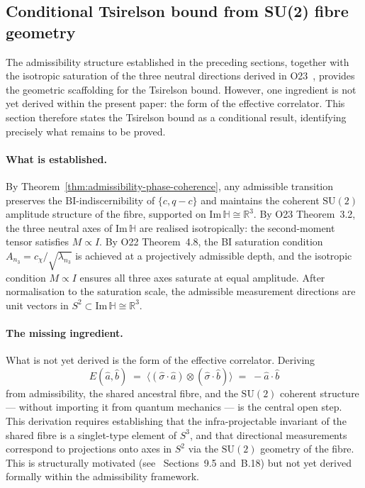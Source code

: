 \subsection{Conditional Tsirelson bound from SU(2) fibre geometry}
  \label{subsec:tsirelson}

  The admissibility structure established in the preceding sections, together with
  the isotropic saturation of the three neutral directions derived in O23~\cite{O23},
  provides the geometric scaffolding for the Tsirelson bound.
  However, one ingredient is not yet derived within the present paper: the
  form of the effective correlator.
  This section therefore states the Tsirelson bound as a conditional result,
  identifying precisely what remains to be proved.

  \paragraph{What is established.}

    By Theorem~\ref{thm:admissibility-phase-coherence}, any admissible transition
    preserves the $\mathrm{BI}$-indiscernibility of $\{c, q-c\}$ and maintains
    the coherent $\mathrm{SU}(2)$ amplitude structure of the fibre, supported on
    $\mathrm{Im}\,\mathbb{H} \cong \mathbb{R}^3$.
    By O23 Theorem~3.2, the three neutral axes of $\mathrm{Im}\,\mathbb{H}$
    are realised isotropically: the second-moment tensor satisfies $M \propto I$.
    By O22 Theorem~4.8, the BI saturation condition $A_{n_3} = c_\chi/\sqrt{\lambda_{n_3}}$
    is achieved at a projectively admissible depth, and the isotropic condition
    $M \propto I$ ensures all three axes saturate at equal amplitude.
    After normalisation to the saturation scale, the admissible measurement directions
    are unit vectors in $S^2 \subset \mathrm{Im}\,\mathbb{H} \cong \mathbb{R}^3$.

  \paragraph{The missing ingredient.}

    What is not yet derived is the form of the effective correlator.
    Deriving
    \begin{equation}
      \label{eq:singlet-correlator}
      E(\hat{a}, \hat{b})
      \;=\;
      \langle (\hat{\sigma} \cdot \hat{a}) \otimes (\hat{\sigma} \cdot \hat{b}) \rangle
      \;=\; -\hat{a} \cdot \hat{b}
    \end{equation}
    from admissibility, the shared ancestral fibre, and the $\mathrm{SU}(2)$
    coherent structure — without importing it from quantum mechanics — is
    the central open step.
    This derivation requires establishing that the infra-projectable invariant
    of the shared fibre is a singlet-type element of $S^3$, and that directional
    measurements correspond to projections onto axes in $S^2$ via the $\mathrm{SU}(2)$
    geometry of the fibre. This is structurally motivated
    (see~\cite{Cosmochrony} Sections~9.5 and~B.18) but not yet derived formally
    within the admissibility framework.

